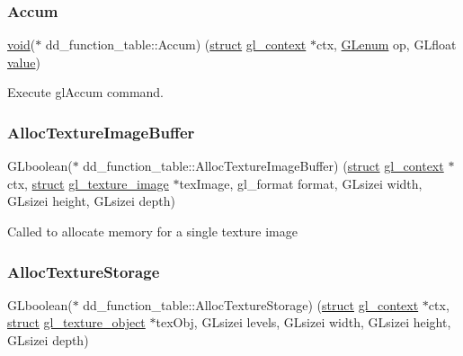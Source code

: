 \subsubsection{\texorpdfstring{Accum}{Accum}}
{\footnotesize\ttfamily \hyperlink{interfacevoid}{void}($\ast$ dd\+\_\+function\+\_\+table\+::\+Accum) (\hyperlink{interfacestruct}{struct} \hyperlink{structgl__context}{gl\+\_\+context} $\ast$ctx, \hyperlink{interfacevoid}{G\+Lenum} op, G\+Lfloat \hyperlink{unionvalue}{value})}

Execute gl\+Accum command. \mbox{\label{structdd__function__table_a0cf36e5c6722b5cf92a942b490afe9c7}} 
\subsubsection{\texorpdfstring{Alloc\+Texture\+Image\+Buffer}{AllocTextureImageBuffer}}
{\footnotesize\ttfamily G\+Lboolean($\ast$ dd\+\_\+function\+\_\+table\+::\+Alloc\+Texture\+Image\+Buffer) (\hyperlink{interfacestruct}{struct} \hyperlink{structgl__context}{gl\+\_\+context} $\ast$ctx, \hyperlink{interfacestruct}{struct} \hyperlink{structgl__texture__image}{gl\+\_\+texture\+\_\+image} $\ast$tex\+Image, gl\+\_\+format format, G\+Lsizei width, G\+Lsizei height, G\+Lsizei depth)}

Called to allocate memory for a single texture image \mbox{\label{structdd__function__table_a566b2982fc336288f889493284132c8f}} 
\subsubsection{\texorpdfstring{Alloc\+Texture\+Storage}{AllocTextureStorage}}
{\footnotesize\ttfamily G\+Lboolean($\ast$ dd\+\_\+function\+\_\+table\+::\+Alloc\+Texture\+Storage) (\hyperlink{interfacestruct}{struct} \hyperlink{structgl__context}{gl\+\_\+context} $\ast$ctx, \hyperlink{interfacestruct}{struct} \hyperlink{structgl__texture__object}{gl\+\_\+texture\+\_\+object} $\ast$tex\+Obj, G\+Lsizei levels, G\+Lsizei width, G\+Lsizei height, G\+Lsizei depth)}


